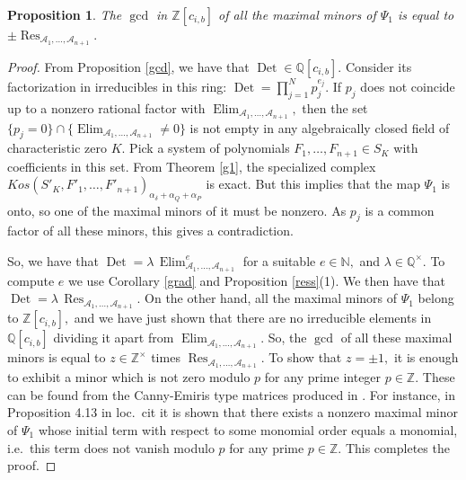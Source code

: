 \documentclass[a4paper,11pt]{amsart}
\newcommand{\Res}{\operatorname{Res}}
\newcommand{\Elim}{\operatorname{Elim}}
\newcommand{\Det}{\operatorname{Det}}
\newcommand{\N}{\mathbb{N}}
\newcommand{\Q}{\mathbb{Q}}
\newcommand{\Z}{\mathbb{Z}}
\newcommand{\cA}{{\mathcal A}}
\newcounter{thm}
\numberwithin{thm}{section}
\numberwithin{equation}{section}
\theoremstyle{definition}
\theoremstyle{plain}
\newtheorem{proposition}[thm]{Proposition}
\begin{document}
\begin{proposition}\label{rmt}
The $\gcd$ in $\Z[c_{i,b}]$ of all the maximal minors of $\Psi_{1}$ is equal to  $\pm \Res_{\cA_1,\ldots, \cA_{n+1}}.$
\end{proposition}
\begin{proof}
From Proposition \ref{gcd}, we have that $\Det\in\Q[c_{i,b}].$ Consider its factorization in irreducibles in this ring: $\Det=\prod_{j=1}^N p_j^{e_j}.$ If $p_j$ does not coincide up to a nonzero rational factor with $\Elim_{\cA_1,\ldots, \cA_{n+1}},$ then the set
$\{p_j=0\}\cap\{\Elim_{\cA_1,\ldots, \cA_{n+1}}\neq0\}$ is not empty in any algebraically closed field of characteristic zero $K$. Pick a system of polynomials $F_1,\ldots, F_{n+1}\in S_K$ with coefficients in this set. From Theorem \ref{g1}, the specialized complex
$Kos(S'_K,F'_1,\ldots,  F'_{n+1})_{\alpha_\delta+\alpha_Q+\alpha_P}$ is exact. But this implies that the map $\Psi_{1}$ is onto, so one of the maximal minors of it must be nonzero. As $p_j$ is a common factor of all these minors, this gives a contradiction.

So, we have that  $\Det=\lambda\,\Elim_{\cA_1,\ldots, \cA_{n+1}}^e$ for a suitable $e\in\N,$ and $\lambda\in\Q^\times.$ To compute $e$ we use Corollary \ref{grad} and Proposition \ref{ress}(1). We then have that $\Det=\lambda\,\Res_{\cA_1,\ldots, \cA_{n+1}}.$  On the other hand, all the maximal minors of $\Psi_{1}$ belong to $\Z[c_{i,b}],$ and we have just shown that there are no irreducible elements in $\Q[c_{i,b}]$ dividing it apart from $\Elim_{\cA_1,\ldots, \cA_{n+1}}.$ So, the $\gcd$ of all these maximal minors is equal to $z\in\Z^\times$ times  $\Res_{\cA_1,\ldots, \cA_{n+1}}.$ To show that $z=\pm1,$ it is enough to exhibit a minor which is not zero modulo $p$ for any prime integer $p\in\Z.$  These can be found from the Canny-Emiris type matrices produced in \cite{DJS23}. For instance, in Proposition 4.13 in loc.~cit it is shown that there exists a nonzero maximal minor of $\Psi_{1}$ whose initial term with respect to some monomial order equals a monomial, i.e.~this term does not vanish modulo $p$ for any prime $p\in\Z.$ This completes the proof.
\end{proof}
\end{document}
